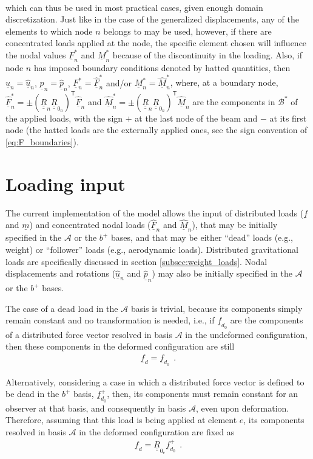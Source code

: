 \documentclass[12pt,a4paper,oneside,english]{abntex2} %
\newcommand{\fix}[1]{{\color{red}#1}}
\newcommand{\vect}[1]{\underline{#1}}
\def\tens#1{\underline{\underline{#1}}}
\def\lp{\left(}
\def\rp{\right)}
\def\T{\mathsf{T}}
\def\A{\mathcal{A}}
\def\bp{b^+}
\def\B*{\mathcal{B}^*}
\def\R{\tens{R}}
\def\u{\vect{u}}
\def\uhat{\widehat{\u}}
\def\p{\vect{p}}
\def\phat{\widehat{\p}}
\def\F{\vect{F}}
\def\Fhat{\widehat{\F}}
\def\M{\vect{M}}
\def\Mhat{\widehat{\M}}
\def\f{\vect{f}}
\def\m{\vect{m}}
\def\Rze{\R_{0_e}}
\begin{document}
\begin{apendicesenv}
\begin{align}
    \label{eq:Msn2} 
\end{align}
which can thus be used in most practical cases, given enough domain discretization. Just like in the case of the generalized displacements, any of the elements to which node $n$ belongs to may be used, however, if there are concentrated loads applied at the node, the specific element chosen will influence the nodal values $\F_n^*$ and $\M_n^*$ because of the discontinuity in the loading. Also, if node $n$ has imposed boundary conditions denoted by hatted quantities, then $\u_n = \uhat_n$, $\p_n = \phat_n$, $\F_n^* = \Fhat_n^*$ and/or $\M_n^* = \Mhat_n^*$\fix{, where, at a boundary node, $\Fhat_n^*=\pm\lp\R_n\R_{0_n}\rp^\T\Fhat_n$ and $\Mhat_n^*=\pm\lp\R_n\R_{0_n}\rp^\T\Mhat_n$ are the components in $\B*$ of the applied loads, with the sign $+$ at the last node of the beam and $-$ at its first node (the hatted loads are the externally applied ones, see the sign convention of \cref{eq:F_boundaries})}.

\section{Loading input}
\label{sec:loads}

The current implementation of the model allows the input of distributed loads ($\f$ and $\m$) and concentrated nodal loads ($\Fhat_n$ and $\Mhat_n$), that may be initially specified in the $\A$ or the $\bp$ bases, and that may be either ``dead'' loads (e.g., weight) or ``follower'' loads (e.g., aerodynamic loads). Distributed gravitational loads are specifically discussed in section \ref{subsec:weight_loads}. Nodal displacements and rotations ($\uhat_n$ and $\phat_n$) may also be initially specified in the $\A$ or the $\bp$ bases.

The case of a dead load in the $\A$ basis is trivial, because its components simply remain constant and no transformation is needed, i.e., if $\f_{d_0}$ are the components of a distributed force vector resolved in basis $\A$ in the undeformed configuration, then these components in the deformed configuration are still
\begin{align}
    \f_d = \f_{d_0} \ \ .
    \label{eq:fd}
\end{align}

Alternatively, considering a case in which a distributed force vector is defined to be dead in the $\bp$ basis, $\f_{d_0}^+$, then, its components must remain constant for an observer at that basis, and consequently in basis $\A$, even upon deformation. Therefore, assuming that this load is being applied at element $e$, its components resolved in basis $\A$ in the deformed configuration are fixed as
\begin{align}
    \f_d = \Rze\f_{d_0}^+ \ \ .
    \label{eq:fdp}
\end{align}


\end{apendicesenv}
\end{document}
